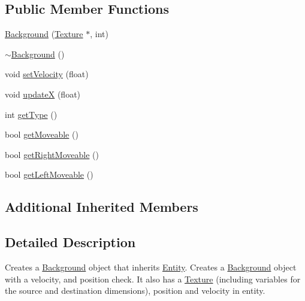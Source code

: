 \subsection*{Public Member Functions}
\begin{DoxyCompactItemize}
\item 
\hyperlink{class_background_a31d67c19cf5dd14c0f07b91e89c8b1f8}{Background} (\hyperlink{class_texture}{Texture} $\ast$, int)
\item 
\hyperlink{class_background_a36754df1deb720393217ade59da41557}{$\sim$\+Background} ()
\item 
void \hyperlink{class_background_a9b358e049be63be31b9241410288514f}{set\+Velocity} (float)
\item 
void \hyperlink{class_background_a1cb5afc5d8857ec4db6c6d393375a4c2}{update\+X} (float)
\item 
int \hyperlink{class_background_a25e0286050106340c34d91d3f1d0f4df}{get\+Type} ()
\item 
bool \hyperlink{class_background_a5f3e6259bb294391cf39d776456e7748}{get\+Moveable} ()
\item 
bool \hyperlink{class_background_a9e2c4dc2434c8123c1fabceecb53a7c0}{get\+Right\+Moveable} ()
\item 
bool \hyperlink{class_background_a6b49b6e383fed26938af98773f0952fa}{get\+Left\+Moveable} ()
\end{DoxyCompactItemize}
\subsection*{Additional Inherited Members}


\subsection{Detailed Description}
Creates a \hyperlink{class_background}{Background} object that inherits \hyperlink{class_entity}{Entity}. Creates a \hyperlink{class_background}{Background} object with a velocity, and position check. It also has a \hyperlink{class_texture}{Texture} (including variables for the source and destination dimensions), position and velocity in entity. 

